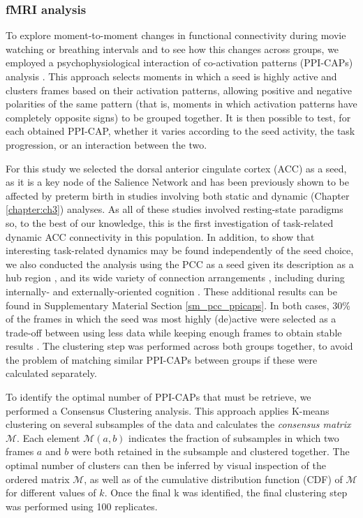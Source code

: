 \subsubsection{fMRI analysis} 
To explore moment-to-moment changes in functional connectivity during movie watching or breathing intervals and to see how this changes across groups, we employed a psychophysiological interaction of co-activation patterns (PPI-CAPs) analysis \citep{Freitas2020}. This approach selects moments in which a seed is highly active and clusters frames based on their activation patterns, allowing positive and negative polarities of the same pattern (that is, moments in which activation patterns have completely opposite signs) to be grouped together. It is then possible to test, for each obtained PPI-CAP, whether it varies according to the seed activity, the task progression, or an interaction between the two. 

For this study we selected the dorsal anterior cingulate cortex (ACC) as a seed, as it is a key node of the Salience Network and has been previously shown to be affected by preterm birth in studies involving both static \citep{White2014,Daamen2015,Lordier2019} and dynamic (Chapter \ref{chapter:ch3}) analyses. As all of these studies involved resting-state paradigms so, to the best of our knowledge, this is the first investigation of task-related dynamic ACC connectivity in this population. In addition, to show that interesting task-related dynamics may be found independently of the seed choice, we also conducted the analysis using the PCC as a seed given its description as a hub region \citep{Andrews-hanna2010}, and its wide variety of connection arrangements \citep{Lin2017}, including during internally- \citep{Raichle2001} and externally-oriented cognition  \citep{Freitas2020}. These additional results can be found in Supplementary Material Section \ref{sm_pcc_ppicaps}. In both cases, 30\% of the frames in which the seed was most highly (de)active were selected as a trade-off between using less data while keeping enough frames to obtain stable results \citep{Freitas2020}. The clustering step was performed across both groups together, to avoid the problem of matching similar PPI-CAPs between groups if these were calculated separately. 

To identify the optimal number of PPI-CAPs that must be retrieve, we performed a Consensus Clustering analysis\citep{Monti2003}. This approach applies K-means clustering on several subsamples of the data and calculates the \textit{consensus matrix} $\mathcal{M}$. Each element $\mathcal{M}(a,b)$ indicates the fraction of subsamples in which two frames $a$ and $b$ were both retained in the subsample and clustered together. The optimal number of clusters can then be inferred by visual inspection of the ordered matrix $\mathcal{M}$, as well as of the cumulative distribution function (CDF) of $\mathcal{M}$  for different values of $k$. Once the final k was identified, the final clustering step was performed using 100 replicates. 


